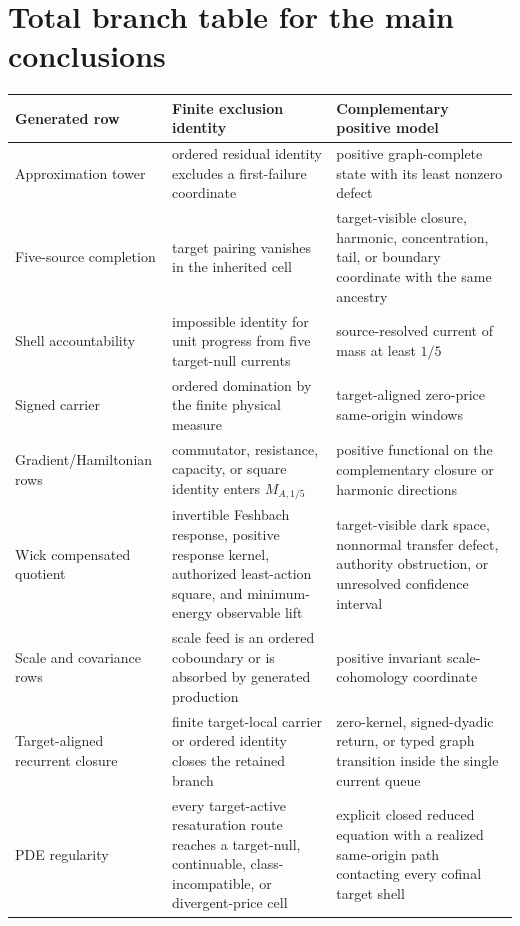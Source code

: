 \documentclass[11pt]{article}
\numberwithin{section}{part}
\theoremstyle{plain}
\theoremstyle{definition}
\theoremstyle{remark}
\begin{document}
\appendix

\section{Total branch table for the main conclusions}
\label{app:branch-table}

\begin{longtable}{p{.27\linewidth}p{.32\linewidth}p{.31\linewidth}}
\toprule
Generated row & Finite exclusion identity & Complementary positive model\\
\midrule
Approximation tower & ordered residual identity excludes a first-failure
coordinate & positive graph-complete state with its least nonzero defect\\
Five-source completion & target pairing vanishes in the inherited cell &
target-visible closure, harmonic, concentration, tail, or boundary coordinate
with the same ancestry\\
Shell accountability & impossible identity for unit progress from five
target-null currents & source-resolved current of mass at least \(1/5\)\\
Signed carrier & ordered domination by the finite physical measure &
target-aligned zero-price same-origin windows\\
Gradient/Hamiltonian rows & commutator, resistance, capacity, or square
identity enters \(M_{A,1/5}\) & positive functional on the complementary
closure or harmonic directions\\
Wick compensated quotient & invertible Feshbach response, positive response
kernel, authorized least-action square, and minimum-energy observable lift &
target-visible dark space,
nonnormal transfer defect, authority obstruction, or unresolved confidence
interval\\
Scale and covariance rows & scale feed is an ordered coboundary or is absorbed
by generated production & positive invariant scale-cohomology coordinate\\
Target-aligned recurrent closure & finite target-local carrier or ordered
identity closes the retained branch & zero-kernel, signed-dyadic return, or
typed graph transition inside the single current queue\\
PDE regularity & every target-active resaturation route reaches a target-null,
continuable, class-incompatible, or divergent-price cell & explicit closed
reduced equation with a realized same-origin path contacting every cofinal
target shell\\
\bottomrule
\end{longtable}
\end{document}
